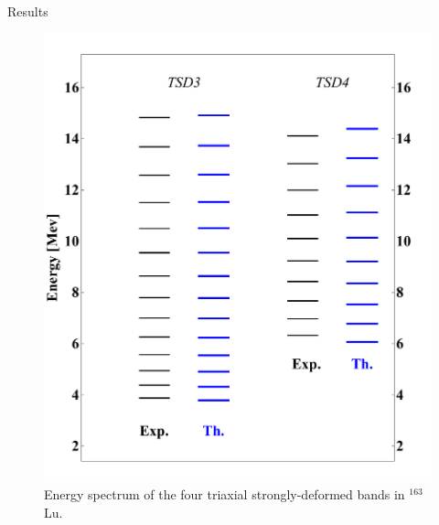 \documentclass[final]{beamer}
\newlength{\colwidth}
\begin{document}
\begin{frame}[t]
\begin{columns}[t]
\begin{column}{\colwidth}
\begin{block}{Results}
\begin{figure}
\begin{minipage}{.5\textwidth}
  \centering
 \includegraphics[scale=0.9]{images/TSD-34.pdf}
\end{minipage}
\caption{Energy spectrum of the four triaxial strongly-deformed bands in $^{163}$Lu.}
    \label{tsd-bands}
\end{figure}


\end{block}
\end{column}
\end{columns}
\end{frame}
\end{document}
